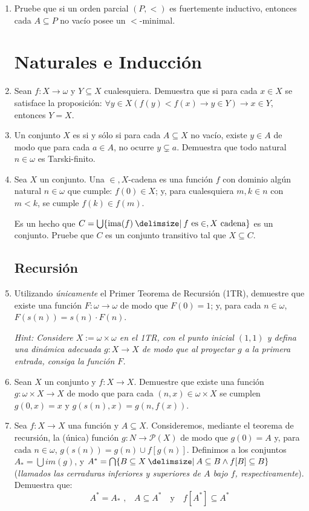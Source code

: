\documentclass[11pt]{article}
\providecommand\st{\;|\;}
\newcommand\SetSymbol[1][]{%
    \nonscript\:#1\vert
    \allowbreak
    \nonscript\:
    \mathopen{}}
\renewcommand\st{\SetSymbol[\delimsize]}
\renewcommand\st{\SetSymbol[\delimsize]}
\newcommand{\set}[1]{\{#1\}}
\DeclareMathOperator{\ima}{ima}
\begin{document}
\begin{enumerate}[\bf\text{Ej.} 1.]
    \item Pruebe que si un orden parcial $(P,<)$ es fuertemente inductivo, entonces cada $A \subseteq P$ no vacío posee un $<$-minimal.
    
    \section*{Naturales e Inducción}
    \item Sean $f:X\to \omega$ y $Y\subseteq X$ cualesquiera. Demuestra que si para cada $x\in X$ se satisface la proposición: $\forall y\in X (f(y)<f(x) \to y\in Y) \to x\in Y$, entonces $Y=X$.
    
    \item Un conjunto $X$ es  si y sólo si para cada $A \subseteq X$ no vacío, existe $y \in A$ de modo que para cada $a \in A$, no ocurre $y \subsetneq a$. Demuestra que todo natural $n \in \omega$ es Tarski-finito.
   

    \item Sea $X$ un conjunto. Una $\in,X$-cadena es una función $f$ con dominio algún natural $n \in \omega$ que cumple: $f(0) \in X$; y, para cualesquiera $m,k \in n$ con $m<k$, se cumple $f(k) \in f(m)$. 
    
    Es un hecho que $C=\bigcup \{ \ima(f) \st f \text{ es} \in,X \text{ cadena}\}$ es un conjunto. Pruebe que $C$ es un conjunto transitivo tal que $X \subseteq C$.

    \subsection*{Recursión}
    \item Utilizando \textit{únicamente} el Primer Teorema de Recursión (1TR), demuestre que existe una función $F:\omega \to \omega$ de modo que $F(0)=1$; y, para cada $n \in \omega$, $F(s(n))=s(n) \cdot F(n)$.
    
    \hfill \textit{Hint: Considere $X:=\omega \times \omega$ en el 1TR, con el punto inicial $(1,1)$ y defina una dinámica adecuada $g:X \to X$ de modo que al proyectar $g$ a la primera entrada, consiga la función $F$.}
    
    \item Sean $X$ un conjunto y $f:X \to X$. Demuestre que existe una función $g:\omega \times X \to X$ de modo que para cada $(n,x) \in \omega \times X$ se cumplen $g(0,x)=x$ y $g(s(n),x)=g(n,f(x))$.

    \item Sea $f\colon X\to X$ una función y $A\subseteq X$. Consideremos, mediante el teorema de recursión, la  (única) función $g\colon N\to \mathscr{P}(X)$ de modo que $g(0) = A$ y, para cada $n \in \omega$, $g(s(n)) = g(n)\cup f[g(n)]$.
    Definimos a los conjuntos $A_*=\bigcup im(g)$, y $A^*= \bigcap\set{B\subseteq X \st A\subseteq B \wedge f[B]\subseteq B}$ (\textit{llamados las cerraduras inferiores y superiores de $A$ bajo $f$, respectivamente}). Demuestra que:
    $$ A^*=A_* \text{ ,} \quad A\subseteq A^* \quad \text{y} \quad f[A^*]\subseteq A^* $$
    \end{enumerate}
\end{document}
